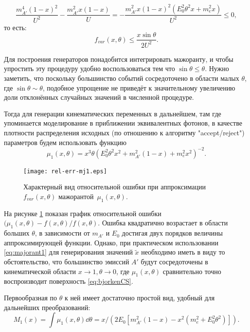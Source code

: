 \begin{equation}
    \frac{m_{A'}^4 (1-x)^2}{U^2} - \frac{m_{A'}^2 x (1-x)}{U} =
    - \frac{m_{A'}^2 x (1-x)^2 (E_0^2 \theta^2 x + m_e^2 x) }{U^2} \le 0,
\end{equation}
то есть:
\begin{equation}
    f_{var}(x, \theta) \le \frac{x \sin \theta}{2 U^2}.
\end{equation}

Для построения генераторов понадобится интегрировать мажоранту, и чтобы
упростить эту процедуру удобно воспользоваться тем что $\sin \theta \le \theta$.
Нужно заметить, что поскольку большинство событий сосредоточено в области
малых $\theta$, где
$\sin \theta \sim \theta$, подобное упрощение не приведёт к значительному
увеличению доли отклонённых случайных значений в численной процедуре.

Тогда для генерации
кинематических переменных в дальнейшем, там где упоминается моделирование в
приближении эквивалентных фотонов, в качестве плотности распределения исходных
(по отношению к алгоритму "accept/reject") параметров будем использовать функцию
\begin{equation}
    \mu_1(x, \theta) = x^3 \theta
        (E_0^2 \theta^2 x^2 + m_{A'}^2(1-x) + m_e^2 x^2)^{-2}.
\label{eq:majorant1}
\end{equation}

\begin{figure}
    \centering
    \texttt{[image: rel-err-mj1.eps]}
    \caption{ Характерный вид относительной ошибки при
    аппроксимации~$f_{var}(x, \theta)$ мажорантой~$\mu_1(x,\theta)$. }
    \label{fig:mj1RelError}
\end{figure}

На рисунке \ref{fig:mj1RelError} показан график относительной
ошибки $(\mu_1(x,\theta) - f(x,\theta)/f(x,\theta)$.
Ошибка квадратично возрастает в области больших $\theta$, в
зависимости от $m_{A'}$ и $E_0$ достигая двух порядков величины аппроксимирующей
функции. Однако, при практическом использовании \eqref{eq:majorant1}
для генерирования значений $\tilde{x}$ необходимо иметь в виду то
обстоятельство, что большинство эмиссий $A'$ будут
сосредоточены в кинематической области $x \rightarrow 1, \theta \rightarrow 0$,
где $\mu_1(x, \theta)$ сравнительно точно воспроизводит поверхность
\eqref{eq:bjorkenCS}.

Первообразная по $\theta$ к ней имеет достаточно простой вид, удобный для
дальнейших преобразований:
\begin{equation}
    M_1(x) = \int \mu_1(x, \theta) \dd{\theta} = x / (2 E_0 \left[m_{A'}^2 (1 - x) - x^2 (m_e^2 + E_0^2 \theta^2) \right]).
\end{equation}

